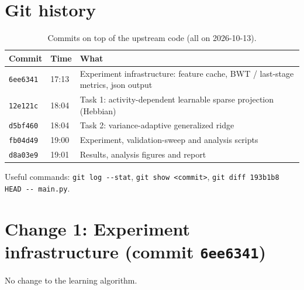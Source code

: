 \documentclass[11pt,a4paper]{article}
\begin{document}
\section{Git history}

\begin{table}[h]
\centering
\caption{Commits on top of the upstream code (all on 2026-10-13).}
\begin{tabularx}{\textwidth}{llL}
\toprule
Commit & Time & What \\
\midrule
\texttt{6ee6341} & 17:13 & Experiment infrastructure: feature cache, BWT / last-stage metrics, json output \\
\texttt{12e121c} & 18:04 & Task 1: activity-dependent learnable sparse projection (Hebbian) \\
\texttt{d5bf460} & 18:04 & Task 2: variance-adaptive generalized ridge \\
\texttt{fb04d49} & 19:00 & Experiment, validation-sweep and analysis scripts \\
\texttt{d8a03e9} & 19:01 & Results, analysis figures and report \\
\bottomrule
\end{tabularx}
\end{table}

Useful commands: \texttt{git log -{}-stat}, \texttt{git show <commit>},
\texttt{git diff 193b1b8 HEAD -{}- main.py}.

\section{Change 1: Experiment infrastructure (commit \texttt{6ee6341})}

No change to the learning algorithm.
\end{document}
